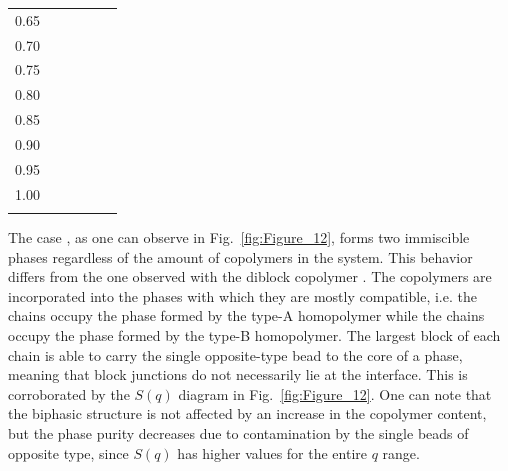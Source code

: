 \documentclass[
aip,
jcp,
reprint,
]{revtex4-1}
\newcommand{\biphasic}[0]{\cellcolor{blue^^2120}{biphasic}}
\newcommand{\lamellae}[0]{\cellcolor{cyan^^2120}{lamellae}}
\newcommand{\defectivelamellae}[0]{\cellcolor{green^^2120}{defective lamellae}}
\begin{document}
\begin{table}
\begin{tabular*}{\textwidth}{@{\extracolsep{\fill}}cccccc}
0.65 & \biphasic & \defectivelamellae & \defectivelamellae & \defectivelamellae & \defectivelamellae \\
0.70 & \biphasic & \defectivelamellae & \defectivelamellae & \defectivelamellae & \defectivelamellae \\
0.75 & \biphasic & \defectivelamellae & \lamellae & \lamellae & \lamellae \\
0.80 & \biphasic & \defectivelamellae & \lamellae & \lamellae & \lamellae \\
0.85 & \biphasic & \lamellae & \lamellae & \lamellae & \lamellae \\
0.90 & \biphasic & \lamellae & \lamellae & \lamellae & \lamellae \\
0.95 & \biphasic & \lamellae & \lamellae & \lamellae & \lamellae \\
1.00 & \biphasic & \lamellae & \lamellae & \lamellae & \lamellae \\
		\hline\hline
\label{table:dynamics}
\end{tabular*}
\end{table}

The case , as one can observe in Fig.~\ref{fig:Figure_12}, forms two immiscible phases regardless of the amount of copolymers in the system.
This behavior differs from the one observed with the diblock copolymer .
The copolymers are incorporated into the phases with which they are mostly compatible, i.e. the  chains occupy the phase formed by the type-A homopolymer while the  chains occupy the phase formed by the type-B homopolymer.
The largest block of each chain is able to carry the single opposite-type bead to the core of a phase, meaning that block junctions do not necessarily lie at the interface.
This is corroborated by the $S(q)$ diagram in Fig.~\ref{fig:Figure_12}.
One can note that the biphasic structure is not affected by an increase in the copolymer content, but the phase purity decreases due to contamination by the single beads of opposite type, since $S(q)$ has higher values for the entire $q$ range.
\end{document}
